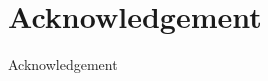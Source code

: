\clearemptydoublepage

\chapter*{Acknowledgement}

\graphicspath{{./0-misc/images/}}

\vspace*{-0.4cm}


Acknowledgement